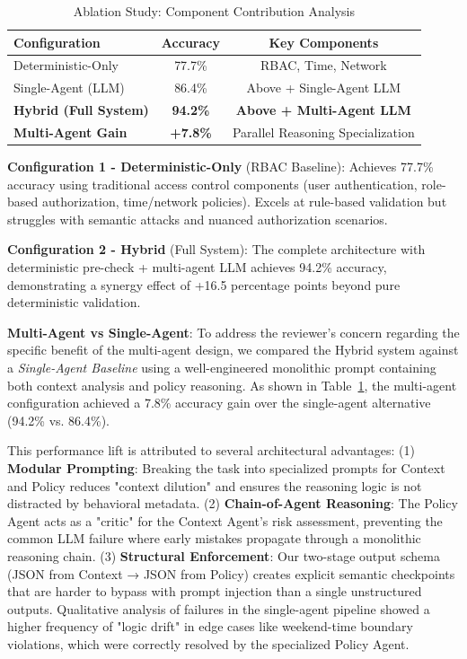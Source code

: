 \documentclass[conference]{IEEEtran}
\begin{document}
\begin{table}[h]
    \centering
    \caption{Ablation Study: Component Contribution Analysis}
    \label{tab:ablation}
    \begin{tabular}{lcc}
        \toprule
        \textbf{Configuration}        & \textbf{Accuracy} & \textbf{Key Components}          \\
        \midrule
        Deterministic-Only            & 77.7\%            & RBAC, Time, Network              \\
        Single-Agent (LLM)            & 86.4\%            & Above + Single-Agent LLM         \\
        \textbf{Hybrid (Full System)} & \textbf{94.2\%}   & \textbf{Above + Multi-Agent LLM} \\
        \midrule
        \textbf{Multi-Agent Gain}     & \textbf{+7.8\%}   & Parallel Reasoning Specialization \\
        \bottomrule
    \end{tabular}
\end{table}

\textbf{Configuration 1 - Deterministic-Only} (RBAC Baseline): Achieves 77.7\% accuracy using traditional access control components (user authentication, role-based authorization, time/network policies). Excels at rule-based validation but struggles with semantic attacks and nuanced authorization scenarios.

\textbf{Configuration 2 - Hybrid} (Full System): The complete architecture with deterministic pre-check + multi-agent LLM achieves 94.2\% accuracy, demonstrating a synergy effect of +16.5 percentage points beyond pure deterministic validation.

\textbf{Multi-Agent vs Single-Agent}: To address the reviewer's concern regarding the specific benefit of the multi-agent design, we compared the Hybrid system against a \textit{Single-Agent Baseline} using a well-engineered monolithic prompt containing both context analysis and policy reasoning. As shown in Table~\ref{tab:ablation}, the multi-agent configuration achieved a 7.8\% accuracy gain over the single-agent alternative (94.2\% vs. 86.4\%). 

This performance lift is attributed to several architectural advantages: (1) \textbf{Modular Prompting}: Breaking the task into specialized prompts for Context and Policy reduces "context dilution" and ensures the reasoning logic is not distracted by behavioral metadata. (2) \textbf{Chain-of-Agent Reasoning}: The Policy Agent acts as a "critic" for the Context Agent's risk assessment, preventing the common LLM failure where early mistakes propagate through a monolithic reasoning chain. (3) \textbf{Structural Enforcement}: Our two-stage output schema (JSON from Context → JSON from Policy) creates explicit semantic checkpoints that are harder to bypass with prompt injection than a single unstructured outputs. Qualitative analysis of failures in the single-agent pipeline showed a higher frequency of "logic drift" in edge cases like weekend-time boundary violations, which were correctly resolved by the specialized Policy Agent. 
\end{document}
